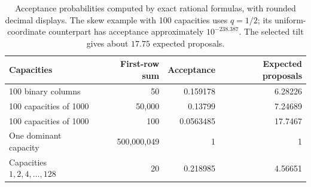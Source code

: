 \begin{table}[H]
\centering\small
\begin{tabular}{@{}lrrr@{}}
\toprule
Capacities & First-row sum & Acceptance & Expected proposals \\
\midrule
100 binary columns & 50 & 0.159178 & 6.28226 \\
100 capacities of 1000 & 50,000 & 0.13799 & 7.24689 \\
100 capacities of 1000 & 100 & 0.0563485 & 17.7467 \\
One dominant capacity & 500,000,049 & 1 & 1 \\
Capacities $1,2,4,\ldots,128$ & 20 & 0.218985 & 4.56651 \\
\bottomrule
\end{tabular}
\caption{Acceptance probabilities computed by exact rational formulas, with rounded decimal displays. The skew example with 100 capacities uses $q=1/2$; its uniform-coordinate counterpart has acceptance approximately $10^{-238.387}$. The selected tilt gives about $17.75$ expected proposals.}
\label{tab:samplingexamples}
\end{table}

